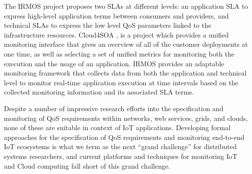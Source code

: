 The IRMOS project \cite{ref3} proposes two SLAs at different levels: an application SLA to express high-level application terms between consumers and providers, and technical SLAs to express the low level QoS parameters linked to the infrastructure resources.
Cloud4SOA \cite{ref31}, is a project which provides a unified monitoring interface that gives an overview of all of the customer deployments at one time, as well as selecting a set of unified metrics for monitoring both the execution and the usage of an application.
IRMOS \cite{ref32} provides an adaptable monitoring framework that collects data from both the application and technical level to monitor real-time application execution at time intervals based on the collected monitoring information and its associated SLA terms. 

Despite a number of impressive research efforts into the specification and monitoring of QoS requirements within networks, web services, grids, and clouds, none of these are suitable in context of IoT applications.
Developing formal approaches for the specification of QoS requirements and monitoring end-to-end IoT ecosystems is what we term as the next ``grand challenge'' for distributed systems researchers,
and current platforms and techniques for monitoring IoT and Cloud computing fall short of this grand challenge.



